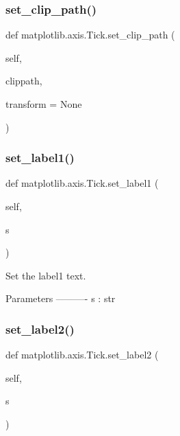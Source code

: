\subsubsection{\texorpdfstring{set\+\_\+clip\+\_\+path()}{set\_clip\_path()}}
{\footnotesize\ttfamily def matplotlib.\+axis.\+Tick.\+set\+\_\+clip\+\_\+path (\begin{DoxyParamCaption}\item[{}]{self,  }\item[{}]{clippath,  }\item[{}]{transform = {\ttfamily None} }\end{DoxyParamCaption})}

\mbox{\label{classmatplotlib_1_1axis_1_1Tick_a0e0e19459866811984d8ca2f37cd35ba}} 
\subsubsection{\texorpdfstring{set\+\_\+label1()}{set\_label1()}}
{\footnotesize\ttfamily def matplotlib.\+axis.\+Tick.\+set\+\_\+label1 (\begin{DoxyParamCaption}\item[{}]{self,  }\item[{}]{s }\end{DoxyParamCaption})}

\begin{DoxyVerb}Set the label1 text.

Parameters
----------
s : str
\end{DoxyVerb}
 \mbox{\label{classmatplotlib_1_1axis_1_1Tick_a98c53487dd780a5a790f3490185c6e8c}} 
\subsubsection{\texorpdfstring{set\+\_\+label2()}{set\_label2()}}
{\footnotesize\ttfamily def matplotlib.\+axis.\+Tick.\+set\+\_\+label2 (\begin{DoxyParamCaption}\item[{}]{self,  }\item[{}]{s }\end{DoxyParamCaption})}


